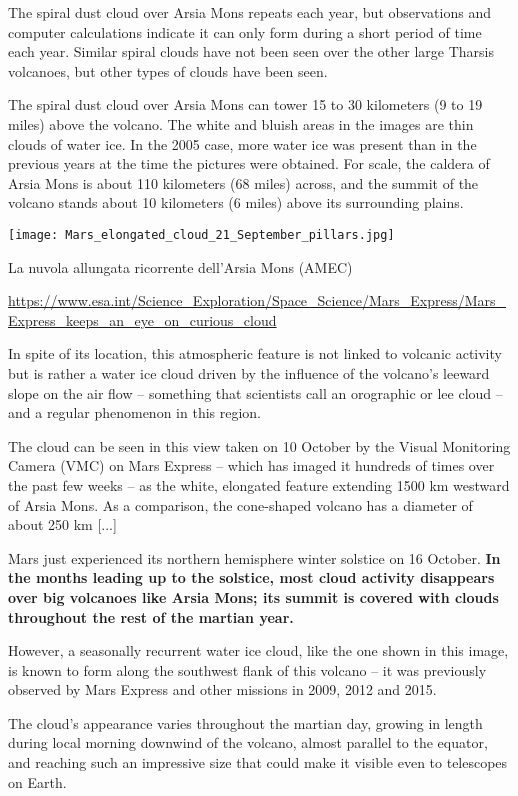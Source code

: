 \documentclass[a4paper,10pt,openany,oneside]{memoir}
\begin{document}
The spiral dust cloud over Arsia Mons repeats each year, but observations and computer calculations indicate it can only form during a short period of time each year. Similar spiral clouds have not been seen over the other large Tharsis volcanoes, but other types of clouds have been seen.

The spiral dust cloud over Arsia Mons can tower 15 to 30 kilometers (9 to 19 miles) above the volcano. The white and bluish areas in the images are thin clouds of water ice. In the 2005 case, more water ice was present than in the previous years at the time the pictures were obtained. For scale, the caldera of Arsia Mons is about 110 kilometers (68 miles) across, and the summit of the volcano stands about 10 kilometers (6 miles) above its surrounding plains. 


\texttt{[image: Mars\_elongated\_cloud\_21\_September\_pillars.jpg]}

La nuvola allungata ricorrente dell'Arsia Mons (AMEC)

\url{https://www.esa.int/Science_Exploration/Space_Science/Mars_Express/Mars_Express_keeps_an_eye_on_curious_cloud}

In spite of its location, this atmospheric feature is not linked to volcanic activity but is rather a water ice cloud driven by the influence of the volcano’s leeward slope on the air flow – something that scientists call an orographic or lee cloud – and a regular phenomenon in this region.

The cloud can be seen in this view taken on 10 October by the Visual Monitoring Camera (VMC) on Mars Express – which has imaged it hundreds of times over the past few weeks – as the white, elongated feature extending 1500 km westward of Arsia Mons. As a comparison, the cone-shaped volcano has a diameter of about 250 km [...]

Mars just experienced its northern hemisphere winter solstice on 16 October. \textbf{In the months leading up to the solstice, most cloud activity disappears over big volcanoes like Arsia Mons; its summit is covered with clouds throughout the rest of the martian year.}

However, a seasonally recurrent water ice cloud, like the one shown in this image, is known to form along the southwest flank of this volcano – it was previously observed by Mars Express and other missions in 2009, 2012 and 2015. 

The cloud’s appearance varies throughout the martian day, growing in length during local morning downwind of the volcano, almost parallel to the equator, and reaching such an impressive size that could make it visible even to telescopes on Earth.
\end{document}
